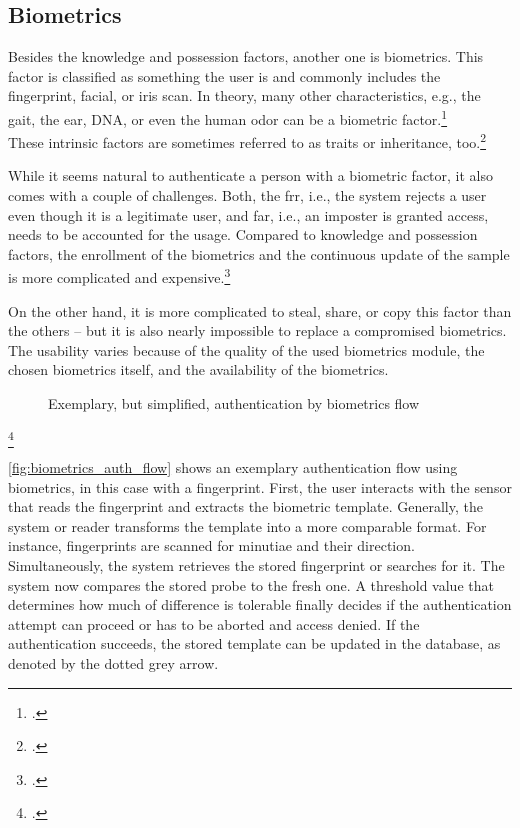 \subsection{Biometrics}

Besides the knowledge and possession factors, another one is biometrics. This factor is classified as \frqq something the user is\flqq{} and commonly includes the fingerprint, facial, or iris scan. In theory, many other characteristics, e.g., the gait, the ear, DNA, or even the human odor can be a biometric factor.\footcite[See][30--34]{Jain2011}\\
These intrinsic factors are sometimes referred to as traits or inheritance, too.\footcite[See][186]{dasgupta2017multi}

While it seems natural to authenticate a person with a biometric factor, it also comes with a couple of challenges. Both, the \gls{frr}, i.e., the system rejects a user even though it is a legitimate user, and \gls{far}, i.e., an imposter is granted access, needs to be accounted for the usage. Compared to knowledge and possession factors, the enrollment of the biometrics and the continuous update of the sample is more complicated and expensive.\footcites[See][18--24]{Jain2011}[See][34--37]{265831}

On the other hand, it is more complicated to steal, share, or copy this factor than the others -- but it is also nearly impossible to replace a compromised biometrics. The usability varies because of the quality of the used biometrics module, the chosen biometrics itself, and the availability of the biometrics.

\begin{figure}[hbt]
	\centering
	
	\caption[Exemplary, but simplified, authentication by biometrics flow]{Exemplary, but simplified, authentication by biometrics flow\footnotemark}
	\label{fig:biometrics_auth_flow}
\end{figure}
\footcitetext[Source: diagram by author, based on][11]{Jain2011}

\autoref{fig:biometrics_auth_flow} shows an exemplary authentication flow using biometrics, in this case with a fingerprint. First, the user interacts with the sensor that reads the fingerprint and extracts the biometric template. Generally, the system or reader transforms the template into a more comparable format. For instance, fingerprints are scanned for minutiae and their direction. Simultaneously, the system retrieves the stored fingerprint or searches for it. The system now compares the stored probe to the fresh one. A threshold value that determines how much of difference is tolerable finally decides if the authentication attempt can proceed or has to be aborted and access denied. If the authentication succeeds, the stored template can be updated in the database, as denoted by the dotted grey arrow.


